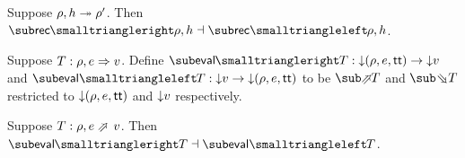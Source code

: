 \begin{theorem}
\label{thm:core-language:closeDefs:gc}
   Suppose $\rho, h \twoheadrightarrow \rho'$.  Then $\closeDefsFwdF{\rho,h} \adjoint \closeDefsBwdF{\rho,h}$.
\end{theorem}

\begin{definition}
   Suppose $T: \rho, e \Rightarrow v$. Define $\evalFwdF{T}: \Below{(\rho, e, \TT)} \to \Below{v}$ and $\evalBwdF{T}: \Below{v} \to \Below{(\rho, e, \TT)}$ to be $\evalFwdR{T}$ and $\evalBwdR{T}$ restricted to ${\downarrow}{(\rho, e, \mathsf{tt})}$ and ${\downarrow}{v}$ respectively.
\end{definition}

\begin{theorem}
\label{thm:core-language:eval:gc}
   Suppose $T: \rho, e \evalFwdS v$.  Then $\evalFwdF{T} \adjoint \evalBwdF{T}$.
\end{theorem}
